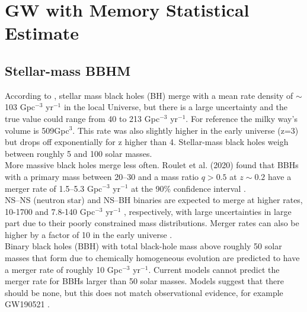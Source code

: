 \documentclass{article}
\begin{document}
\section{GW with Memory Statistical Estimate}


\subsection{Stellar-mass BBHM}

According to \cite{eldridge2019consistent}, stellar mass black holes (BH) merge with a mean rate density of $\sim$103 Gpc$^{-3}$ yr$^{-1}$ in the local Universe, but there is a large uncertainty and the true value could range from 40 to 213 Gpc$^{-3}$ yr$^{-1}$. For reference the milky way's volume is 509Gpc$^{3}$. This rate was also slightly higher in the early universe (z=3) but drops off exponentially for z higher than 4. Stellar-mass black holes weigh between roughly 5 and 100 solar masses. 
\\

More massive black holes merge less often. Roulet et al. (2020) found that BBHs with a primary mass between 20–30 and a mass ratio $q > 0.5$ at $z \sim 0.2$ have a merger rate of 1.5–5.3 Gpc$^{-3}$ yr$^{-1}$ at the 90\% confidence interval \cite{roulet2020binary}. 
\\

NS–NS (neutron star) and NS–BH binaries are expected to merge at higher rates, 10-1700 and 7.8-140 Gpc$^{-3}$ yr$^{-1}$ \cite{abbott2023population}, respectively, with large uncertainties in large part due to their poorly constrained mass distributions. Merger rates can also be higher by a factor of 10 in the early universe \cite{mandel2022rates}. 
\\

Binary black holes (BBH) with total black-hole mass above roughly 50 solar masses that form due to chemically homogeneous evolution are predicted to have a merger rate of roughly 10 Gpc$^{-3}$ yr$^{-1}$. Current models cannot predict the merger rate for BBHs larger than 50 solar masses. Models suggest that there should be none, but this does not match observational evidence, for example GW190521 \cite{mandel2022merging}. 
\\
\end{document}
